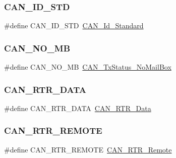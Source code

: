 \mbox{\label{group___c_a_n___legacy_ga284ca16658deb9d0c21f4ddc6db14833}} 
\subsubsection{\texorpdfstring{CAN\_ID\_STD}{CAN\_ID\_STD}}
{\footnotesize\ttfamily \#define C\+A\+N\+\_\+\+I\+D\+\_\+\+S\+TD~\mbox{\hyperlink{group___c_a_n__identifier__type_ga151d9df8a6f361d0a3231593726b5a13}{C\+A\+N\+\_\+\+Id\+\_\+\+Standard}}}

\mbox{\label{group___c_a_n___legacy_ga418f1fd7ca2e852b263fd07874fde0c6}} 
\subsubsection{\texorpdfstring{CAN\_NO\_MB}{CAN\_NO\_MB}}
{\footnotesize\ttfamily \#define C\+A\+N\+\_\+\+N\+O\+\_\+\+MB~\mbox{\hyperlink{group___c_a_n__transmit__constants_ga2620e99debd51011d3569121f2e44690}{C\+A\+N\+\_\+\+Tx\+Status\+\_\+\+No\+Mail\+Box}}}

\mbox{\label{group___c_a_n___legacy_gab1e89074b4fcfebf81c323909625b0d0}} 
\subsubsection{\texorpdfstring{CAN\_RTR\_DATA}{CAN\_RTR\_DATA}}
{\footnotesize\ttfamily \#define C\+A\+N\+\_\+\+R\+T\+R\+\_\+\+D\+A\+TA~\mbox{\hyperlink{group___c_a_n__remote__transmission__request_ga2407c3a8b2cd97bd651143aa959219f1}{C\+A\+N\+\_\+\+R\+T\+R\+\_\+\+Data}}}

\mbox{\label{group___c_a_n___legacy_gab15c649e3e497c6d1145bb98ff7f3f04}} 
\subsubsection{\texorpdfstring{CAN\_RTR\_REMOTE}{CAN\_RTR\_REMOTE}}
{\footnotesize\ttfamily \#define C\+A\+N\+\_\+\+R\+T\+R\+\_\+\+R\+E\+M\+O\+TE~\mbox{\hyperlink{group___c_a_n__remote__transmission__request_ga42e95ddfb02d88c82de84058fb0fb349}{C\+A\+N\+\_\+\+R\+T\+R\+\_\+\+Remote}}}

